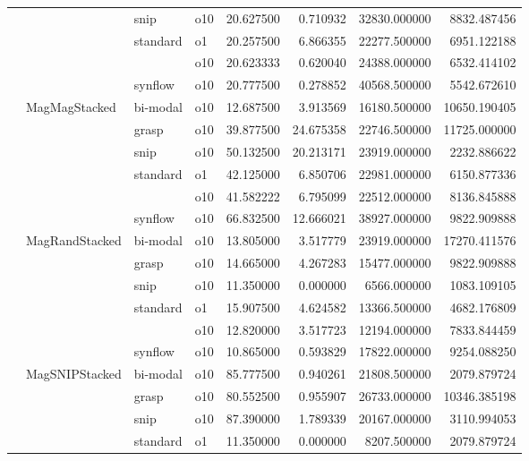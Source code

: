 \begin{longtable}{llllrrrr}
      &     & snip & o10 &  20.627500 &   0.710932 &     32830.000000 &   8832.487456 \\
      &     & standard & o1 &  20.257500 &   6.866355 &     22277.500000 &   6951.122188 \\
      &     &         & o10 &  20.623333 &   0.620040 &     24388.000000 &   6532.414102 \\
      &     & synflow & o10 &  20.777500 &   0.278852 &     40568.500000 &   5542.672610 \\
      & MagMagStacked & bi-modal & o10 &  12.687500 &   3.913569 &     16180.500000 &  10650.190405 \\
      &     & grasp & o10 &  39.877500 &  24.675358 &     22746.500000 &  11725.000000 \\
      &     & snip & o10 &  50.132500 &  20.213171 &     23919.000000 &   2232.886622 \\
      &     & standard & o1 &  42.125000 &   6.850706 &     22981.000000 &   6150.877336 \\
      &     &         & o10 &  41.582222 &   6.795099 &     22512.000000 &   8136.845888 \\
      &     & synflow & o10 &  66.832500 &  12.666021 &     38927.000000 &   9822.909888 \\
      & MagRandStacked & bi-modal & o10 &  13.805000 &   3.517779 &     23919.000000 &  17270.411576 \\
      &     & grasp & o10 &  14.665000 &   4.267283 &     15477.000000 &   9822.909888 \\
      &     & snip & o10 &  11.350000 &   0.000000 &      6566.000000 &   1083.109105 \\
      &     & standard & o1 &  15.907500 &   4.624582 &     13366.500000 &   4682.176809 \\
      &     &         & o10 &  12.820000 &   3.517723 &     12194.000000 &   7833.844459 \\
      &     & synflow & o10 &  10.865000 &   0.593829 &     17822.000000 &   9254.088250 \\
      & MagSNIPStacked & bi-modal & o10 &  85.777500 &   0.940261 &     21808.500000 &   2079.879724 \\
      &     & grasp & o10 &  80.552500 &   0.955907 &     26733.000000 &  10346.385198 \\
      &     & snip & o10 &  87.390000 &   1.789339 &     20167.000000 &   3110.994053 \\
      &     & standard & o1 &  11.350000 &   0.000000 &      8207.500000 &   2079.879724 \\

\end{longtable}
